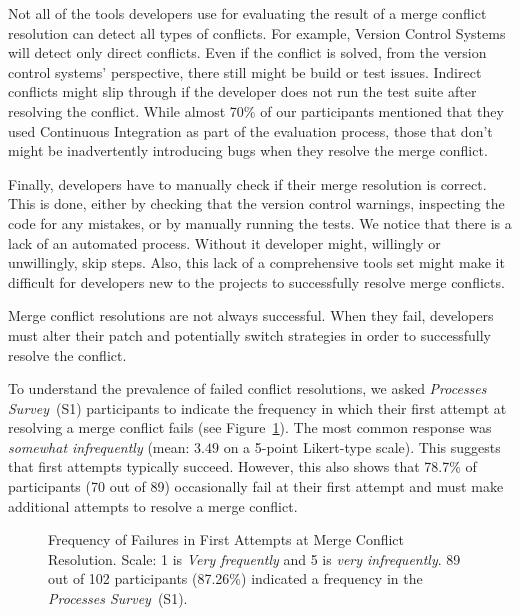 Not all of the tools developers use for evaluating the result of a merge conflict resolution can detect all types of conflicts.
For example, Version Control Systems will detect only direct conflicts.
Even if the conflict is solved, from the version control systems' perspective, there still might be build or test issues.
Indirect conflicts might slip through if the developer does not run the test suite after resolving the conflict.
While almost 70\% of our participants mentioned that they used Continuous Integration as part of the evaluation process, those that don't might be inadvertently introducing bugs when they resolve the merge conflict.

Finally, developers have to manually check if their merge resolution is correct.
This is done, either by checking that the version control warnings, inspecting the code for any mistakes, or by manually running the tests.
We notice that there is a lack of an automated process.
Without it developer might, willingly or unwillingly, skip steps.
Also, this lack of a comprehensive tools set might make it difficult for developers new to the projects to successfully resolve merge conflicts.



Merge conflict resolutions are not always successful.
When they fail, developers must alter their patch and potentially switch strategies in order to successfully resolve the conflict.

To understand the prevalence of failed conflict resolutions, we asked \textit{Processes Survey}~(S1) participants to indicate the frequency in which their first attempt at resolving a merge conflict fails (see Figure~\ref{fig:first-attempt-failure}).
The most common response was \textit{somewhat infrequently} (mean: $3.49$ on a 5-point Likert-type scale).
This suggests that first attempts typically succeed.
However, this also shows that 78.7\% of participants (70 out of 89) occasionally fail at their first attempt and must make additional attempts to resolve a merge conflict.

\begin{figure}
	\centering
	\caption{Frequency of Failures in First Attempts at Merge Conflict Resolution. Scale: 1 is \textit{Very frequently} and 5 is \textit{very infrequently}. 89 out of 102 participants (87.26\%) indicated a frequency in the \textit{Processes Survey}~(S1).\vspace*{-0.3\baselineskip}}
	\label{fig:first-attempt-failure}
\end{figure}

